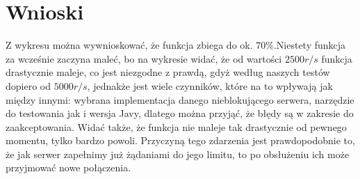 \documentclass{article}
\begin{document}
    \section{Wnioski}
    Z wykresu można wywnioskować, że funkcja zbiega do ok. $70\%$.\newline Niestety funkcja za wcześnie zaczyna maleć, bo na wykresie
    widać, że od wartości $2500r/s$ funkcja drastycznie maleje, co jest niezgodne z prawdą, gdyż według naszych testów dopiero od $5000r/s$,
    jednakże jest wiele czynników, które na to wpływają jak między innymi: wybrana implementacja danego nieblokującego serwera,
    narzędzie do testowania jak i wersja Javy, dlatego można przyjąć, że błędy są w zakresie do zaakceptowania.\newline
    Widać także, że funkcja nie maleje tak drastycznie od pewnego momentu, tylko bardzo powoli. Przyczyną tego zdarzenia
    jest prawdopodobnie to, że jak serwer zapełnimy już żądaniami do jego limitu, to po obsłużeniu ich może przyjmować
    nowe połączenia.
\end{document}
